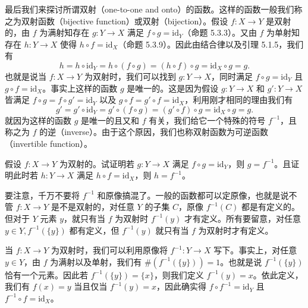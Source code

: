 最后我们来探讨所谓双射（one-to-one and onto）的函数。这样的函数一般我们称之为双射函数（bijective function）或双射（bijection）。假设 $f : X \to Y$ 是双射的，由 $f$ 为满射知存在 $g : Y \to X$ 满足 $f \circ g = \mathrm{id}_Y$（命题 5.3.3）。又由 $f$ 为单射知存在 $h : Y \to X$ 使得 $h \circ f = \mathrm{id}_X$（命题 5.3.9）。因此由结合律以及引理 5.1.5，我们有
$$ h = h \circ \mathrm{id}_Y = h \circ (f \circ g) = (h \circ f) \circ g = \mathrm{id}_X \circ g = g. $$
也就是说当 $f : X \to Y$ 为双射时，我们可以找到 $g : Y \to X$，同时满足 $f \circ g = \mathrm{id}_Y$ 且 $g \circ f = \mathrm{id}_X$。事实上这样的函数 $g$ 是唯一的。这是因为假设 $g : Y \to X$ 和 $g' : Y \to X$ 皆满足 $f \circ g = f \circ g' = \mathrm{id}_Y$ 以及 $g \circ f = g' \circ f = \mathrm{id}_X$，利用刚才相同的理由我们有
$$ g' = g' \circ \mathrm{id}_Y = g' \circ (f \circ g) = (g' \circ f) \circ g = \mathrm{id}_X \circ g = g. $$
就因为这样的函数 $g$ 是唯一的且又和 $f$ 有关，我们给它一个特殊的符号 $f^{-1}$，且称之为 $f$ 的逆（inverse）。由于这个原因，我们也称双射函数为可逆函数（invertible function）。

\begin{question}
假设 $f : X \to Y$ 为双射的。试证明若 $g : Y \to X$ 满足 $f \circ g = \mathrm{id}_Y$，则 $g = f^{-1}$。且证明此时若 $h : Y \to X$ 满足 $h \circ f = \mathrm{id}_X$，则 $h = f^{-1}$。
\end{question}

要注意，千万不要将 $f^{-1}$ 和原像搞混了。一般的函数都可以定原像，也就是说不管 $f : X \to Y$ 是不是双射的，对任意 $Y$ 的子集 $C$，原像 $f^{-1}(C)$ 都是有定义的。但对于 $Y$ 元素 $y$，就只有当 $f$ 为双射时 $f^{-1}(y)$ 才有定义。所有要留意，对任意 $y \in Y, f^{-1}(\{y\})$ 都有定义，但 $f^{-1}(y)$ 就只有当 $f$ 为双射时才有定义。

当 $f : X \to Y$ 为双射时，我们可以利用原像将 $f^{-1} : Y \to X$ 写下。事实上，对任意 $y \in Y$，由 $f$ 为满射以及单射，我们有 $\#(f^{-1}(\{y\})) = 1$。也就是说 $f^{-1}(\{y\})$ 恰有一个元素。因此若 $f^{-1}(\{y\}) = \{x\}$，则我们定义 $f^{-1}(y) = x$。依此定义，我们有 $f(x) = y$ 当且仅当 $f^{-1}(y) = x$，因此确实得 $f \circ f^{-1} = \mathrm{id}_Y$ 且 $f^{-1} \circ f = \mathrm{id}_X$。

